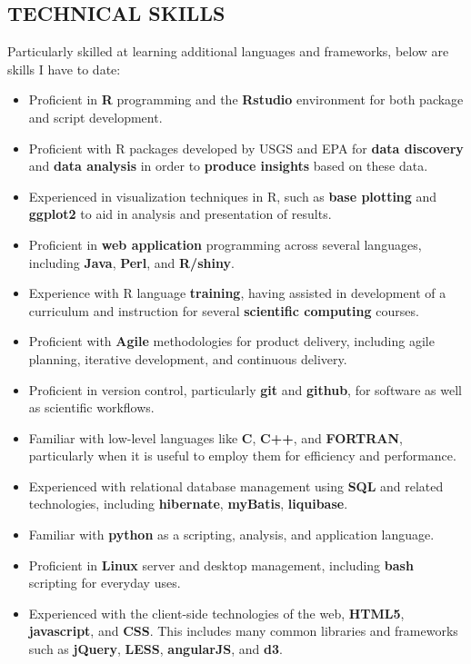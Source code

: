 \documentclass[line,margin]{res}
\begin{document}
\begin{resume}
\section{TECHNICAL SKILLS}
	Particularly skilled at learning additional languages and frameworks, below are skills I have to date:
\begin{itemize}
	\item Proficient in \textbf{R} programming and the \textbf{Rstudio} environment for both package and script development.
	\item Proficient with R packages developed by USGS and EPA for \textbf{data discovery} and \textbf{data analysis} in order to \textbf{produce insights} based on these data.
	\item Experienced in visualization techniques in R, such as \textbf{base plotting} and \textbf{ggplot2} to aid in analysis and presentation of results.
	\item Proficient in \textbf{web application} programming across several languages, including \textbf{Java}, \textbf{Perl}, and \textbf{R/shiny}.
	\item Experience with R language \textbf{training}, having assisted in development of a curriculum and instruction for several \textbf{scientific computing} courses.
	\item Proficient with \textbf{Agile} methodologies for product delivery, including agile planning, iterative development, and continuous delivery.
	\item Proficient in version control, particularly \textbf{git} and \textbf{github}, for software as well as scientific workflows.
	\item Familiar with low-level languages like \textbf{C}, \textbf{C++}, and \textbf{FORTRAN}, particularly when it is useful to employ them for efficiency and performance.
	\item Experienced with relational database management using \textbf{SQL} and related technologies, including \textbf{hibernate}, \textbf{myBatis}, \textbf{liquibase}.
	\item Familiar with \textbf{python} as a scripting, analysis, and application language.
	\item Proficient in \textbf{Linux} server and desktop management, including \textbf{bash} scripting for everyday uses.
	\item Experienced with the client-side technologies of the web, \textbf{HTML5}, \textbf{javascript}, and \textbf{CSS}.  This includes many common libraries and frameworks such as \textbf{jQuery}, \textbf{LESS}, \textbf{angularJS}, and \textbf{d3}.

\end{itemize}
\end{resume}
\end{document}
